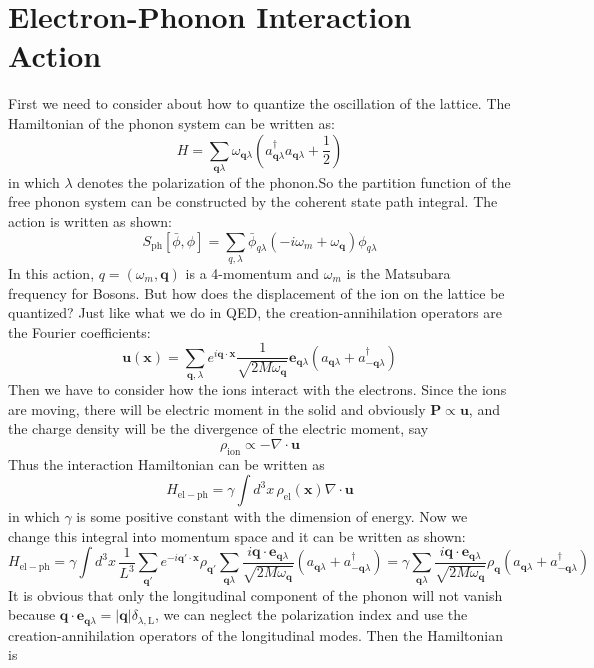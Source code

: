 \documentclass{article}
\newcommand{\mtq}{\mathbf{q}}
\begin{document}
\section{Electron-Phonon Interaction Action}
First we need to consider about how to quantize the oscillation of the lattice. The Hamiltonian of the phonon system can be written as:
$$
H = \sum_{\mtq \lambda} \omega_{\mtq\lambda} \left(a^\dagger_{\mtq\lambda}a_{\mtq\lambda}+\frac{1}{2}\right)
$$
in which $\lambda$ denotes the polarization of the phonon.So the partition function of the free phonon system can be constructed by the coherent state path integral. The action is written as shown:
\begin{equation}
S_{\mathrm{ph}}[\bar{\phi},\phi] = \sum_{q,\lambda}\bar{\phi}_{q\lambda}\left(-i\omega_m + \omega_\mtq\right)\phi_{q\lambda}
\end{equation}
In this action, $q = (\omega_m,\mtq)$ is a 4-momentum and $\omega_m$ is the Matsubara frequency for Bosons. But how does the displacement of the ion on the lattice be quantized? Just like what we do in QED, the creation-annihilation operators are the Fourier coefficients:
\begin{equation}
\mathbf{u}(\mathbf{x}) = \sum_{\mtq,\lambda}e^{i \mtq \cdot \mathbf{x}}\frac{1}{\sqrt{2M\omega_\mtq}}\mathbf{e}_{\mtq\lambda}(a_{\mtq\lambda}+a^\dagger_{-\mtq\lambda})
\end{equation}
Then we have to consider how the ions interact with the electrons. Since the ions are moving, there will be electric moment in the solid and obviously $\mathbf{P}\propto \mathbf{u}$, and the charge density will be the divergence of the electric moment, say
$$
\rho_{\mathrm{ion}} \propto -\nabla \cdot \mathbf{u}
$$ 
Thus the interaction Hamiltonian can be written as
$$
H_{\mathrm{el-ph}} = \gamma \int d^3x \,\rho_{\mathrm{el}}(\mathbf{x}) \nabla\cdot\mathbf{u}
$$
in which $\gamma$ is some positive constant with the dimension of energy. Now we change this integral into momentum space and it can be written as shown:
\begin{equation}
H_{\mathrm{el-ph}} = \gamma\int d^3x\, \frac{1}{L^3} \sum_{\mtq'}e^{-i\mtq'\cdot\mathbf{x}}\rho_{\mtq'}\sum_{\mtq\lambda}\frac{i\mtq\cdot \mathbf{e}_{\mtq\lambda}}{\sqrt{2M\omega_{\mtq}}}(a_{\mtq\lambda}+ a^\dagger_{-\mtq\lambda}) = \gamma \sum_{\mtq\lambda}\frac{i\mtq\cdot\mathbf{e}_{\mtq\lambda}}{\sqrt{2M\omega_{\mtq}}}\rho_{\mtq}(a_{\mtq\lambda}+ a^\dagger_{-\mtq\lambda}) 
\end{equation}
It is obvious that only the longitudinal component of the phonon will not vanish because $\mtq\cdot\mathbf{e}_{\mtq\lambda} = |\mtq|\delta_{\lambda,\mathrm{L}} $, we can neglect the polarization index and use the creation-annihilation operators of the longitudinal modes. Then the Hamiltonian is
\end{document}

